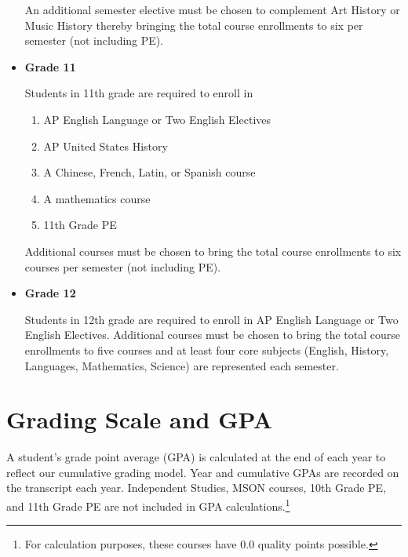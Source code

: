 \begin{itemize}
  An additional semester elective must be chosen to complement Art History or Music History thereby bringing the total course enrollments to six per semester (not including PE).
  
  \item[] \textbf{Grade 11}
  
  Students in 11th grade are required to enroll in 
\begin{enumerate}\itemsep=0mm
    \item AP English Language or Two English Electives
    \item AP United States History
    \item A Chinese, French, Latin, or Spanish course 
    \item A mathematics course
    \item 11th Grade PE
  \end{enumerate}
  
  Additional courses must be chosen to bring the total course enrollments to six courses per semester (not including PE).
  
  \item[] \textbf{Grade 12    }
  
  Students in 12th grade are required to enroll in AP English Language or Two English Electives.  Additional courses must be chosen to bring the total course enrollments to five courses and at least four core subjects (English, History, Languages, Mathematics, Science) are represented each semester.

\end{itemize}

\section{Grading Scale and GPA}

A student's grade point average (GPA) is calculated at the end of each year to reflect our cumulative grading model. Year and cumulative GPAs are recorded on the transcript each year.  Independent Studies, MSON courses, 10th Grade PE, and 11th Grade PE are not included in GPA calculations.\footnote{For calculation purposes, these courses have $0.0$ quality points possible.}

